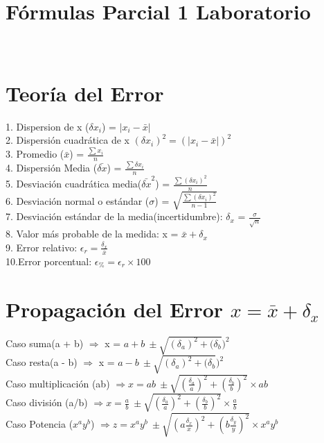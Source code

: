 \documentclass[14pt]{extarticle}
\begin{document}
	\section*{}
	
	\section*{\centering Fórmulas Parcial 1 Laboratorio}
	\section*{\\ \normalsize Teoría del Error }
	1. Dispersion de x ($\delta x_i $) = $| x_i - \bar{x}|$ \\
	2. Dispersión cuadrática de x $(\delta x_i)^2 = (| x_i - \bar{x}|)^2$\\
	3. Promedio ($\bar{x}$) = $\frac{\sum x_i}{n}$ \\
	4. Dispersión Media ($\bar{\delta x}$) = $\frac{\sum \delta x_i}{n}$ \\
	5. Desviación cuadrática media($\bar{\delta x}^2$) = $\frac{\sum (\delta x_i)^2}{n}$ \\
	6. Desviación normal o estándar ($\sigma$) = $\sqrt{\frac{\sum (\delta x_i)^2}{n-1}}$\\
	7. Desviación estándar de la media(incertidumbre): $\delta_x$ = $\frac{\sigma}{\sqrt{n}}$\\
	8. Valor más probable de la medida: x = $\bar{x} + \delta_x$\\
	9. Error relativo: $\epsilon_r = \frac{\delta_x}{\bar{x}}$\\
	10.Error porcentual: $\epsilon_\% = \epsilon_r \times 100$
	\section*{\normalsize Propagación del Error $x = \bar{x} + \delta_x$}
	Caso suma(a + b)  $\Rightarrow$ x = $a + b \ \pm \sqrt{(\delta_a)^2 + (\delta_b})^2$ \\
	Caso resta(a - b)  $\Rightarrow$ x = $a - b \ \pm \sqrt{(\delta_a)^2 + (\delta_b})^2 $ \\
	Caso multiplicación (ab) $\Rightarrow x = ab \ \pm
	\sqrt{(\frac{\delta_a}{a})^2 + (\frac{\delta_b}{b})^2} \times ab$ \\
	Caso división (a/b)   $\Rightarrow x = \frac{a}{b} \ \pm
	\sqrt{(\frac{\delta_a}{a})^2 + (\frac{\delta_b}{b})^2} \times \frac{a}{b}$ \\
	Caso Potencia ($x^a y^b$) $\Rightarrow z = x^a y^b \ \pm
	\sqrt{(a \frac{\delta_x}{x})^2 + (b\frac{\delta_y}{y})^2} \times x^a y^b $ 	
\end{document}
